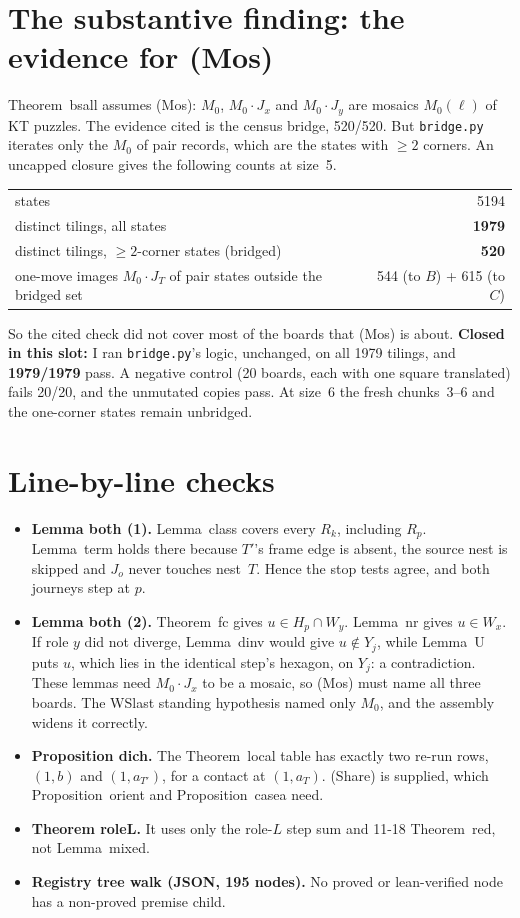 \documentclass[11pt]{article}
\begin{document}
\section*{The substantive finding: the evidence for (Mos)}
Theorem~bsall assumes (Mos): $M_0$, $M_0\cdot J_x$ and $M_0\cdot J_y$ are mosaics $M_0(\ell)$ of KT puzzles. The evidence cited is the census bridge, 520/520. But \texttt{bridge.py} iterates only the $M_0$ of pair records, which are the states with $\ge2$ corners. An uncapped closure gives the following counts at size~5.
\begin{center}\small\begin{tabular}{lr}\toprule
states & 5194\\
distinct tilings, all states & \textbf{1979}\\
distinct tilings, $\ge2$-corner states (bridged) & \textbf{520}\\
one-move images $M_0\cdot J_T$ of pair states outside the bridged set & 544 (to $B$) + 615 (to $C$)\\\bottomrule
\end{tabular}\end{center}
So the cited check did not cover most of the boards that (Mos) is about. \textbf{Closed in this slot:} I ran \texttt{bridge.py}'s logic, unchanged, on all 1979 tilings, and \textbf{1979/1979} pass. A negative control (20 boards, each with one square translated) fails 20/20, and the unmutated copies pass. At size~6 the fresh chunks~3--6 and the one-corner states remain unbridged.

\section*{Line-by-line checks}
\begin{itemize}
\item \textbf{Lemma both (1).} Lemma~class covers every $R_k$, including $R_p$. Lemma~term holds there because $T'$'s frame edge is absent, the source nest is skipped and $J_o$ never touches nest~$T$. Hence the stop tests agree, and both journeys step at $p$.
\item \textbf{Lemma both (2).} Theorem~fc gives $u\in H_p\cap W_y$. Lemma~nr gives $u\in W_x$. If role $y$ did not diverge, Lemma~dinv would give $u\notin Y_j$, while Lemma~U puts $u$, which lies in the identical step's hexagon, on $Y_j$: a contradiction. These lemmas need $M_0\cdot J_x$ to be a mosaic, so (Mos) must name all three boards. The WSlast standing hypothesis named only $M_0$, and the assembly widens it correctly.
\item \textbf{Proposition dich.} The Theorem~local table has exactly two re-run rows, $(1,b)$ and $(1,a_{T'})$, for a contact at $(1,a_T)$. (Share) is supplied, which Proposition~orient and Proposition~casea need.
\item \textbf{Theorem roleL.} It uses only the role-$L$ step sum and 11-18 Theorem~red, not Lemma~mixed.
\item \textbf{Registry tree walk (JSON, 195 nodes).} No proved or lean-verified node has a non-proved premise child.
\end{itemize}
\end{document}
